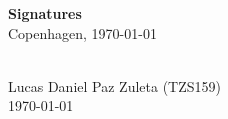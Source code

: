 \vspace{2em}
\begin{center}
    \textbf{Signatures}\\[0.5em]
    {\small Copenhagen, \today}
    \end{center}
    
    \vspace{2.5em}
    
    \noindent
    \begin{minipage}[t]{0.48\textwidth}
      \\[0.5em]
      Lucas Daniel Paz Zuleta (TZS159)\\
      {\small \today}
  \end{minipage}\hfill
    
    \vspace{7em}
    
    \noindent

    \newpage